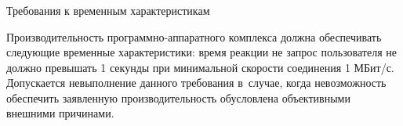 \subsubsection{} Требования к временным характеристикам
\label{sec:analysis:research:req:timing}

Производительность программно-аппаратного комплекса должна обеспечивать следующие временные характеристики: время реакции не запрос пользователя не должно превышать 1 секунды при минимальной скорости соединения 1 МБит/с. Допускается невыполнение данного требования в~случае, когда невозможность обеспечить заявленную производительность обусловлена объективными внешними причинами.